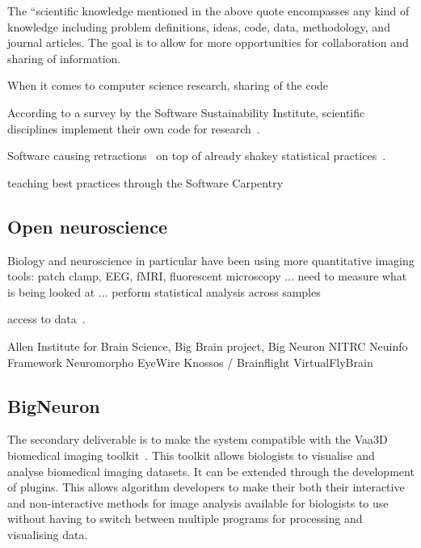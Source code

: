 The ``scientific knowledge mentioned in the above quote
encompasses any kind of knowledge including problem definitions,
ideas, code, data, methodology, and journal articles. The goal is
to allow for more opportunities for collaboration and sharing of
information.

When it comes to computer science research, sharing of the code 

According to a survey by the Software Sustainability Institute,
scientific disciplines implement their own code for
research~\autocite{SSI:hettrick_2014_14809}.

Software causing retractions~\autocite{Miller2006,Merali2010,Joppa2013}
on top of already shakey statistical
practices~\autocite{Ioannidis2005,Button2013}.

teaching best practices through the Software Carpentry~\autocite{Wilson2006,Wilson2014}


\subsection{Open neuroscience}
Biology and neuroscience in particular have been using more
quantitative imaging tools: patch clamp, EEG, fMRI, fluorescent
microscopy ... need to measure what is being looked at ... perform
statistical analysis across samples

access to data~\autocite{NeuroMorphVariability:Parekh:2015,Poldrack2011}.

Allen Institute for Brain Science,
Big Brain project,
Big Neuron
NITRC
Neuinfo  Framework
Neuromorpho
EyeWire
Knossos / Brainflight
VirtualFlyBrain
~\autocite{NeuroDebian:Halchenko:2012}

\subsection{BigNeuron}\label{subsec:bigneuron}

{ %
	The secondary deliverable is to make the system compatible
	with the Vaa3D biomedical imaging toolkit~\autocite{Vaa3D:site:2015,Vaa3D:Peng:2010,Vaa3D:Peng:2014}.
	This toolkit allows biologists to visualise and analyse
	biomedical imaging datasets. It can be extended through
	the development of plugins. This allows algorithm
	developers to make their both their interactive and
	non-interactive methods for image analysis available
	for biologists to use without having to switch between
	multiple programs for processing and visualising data.
}

